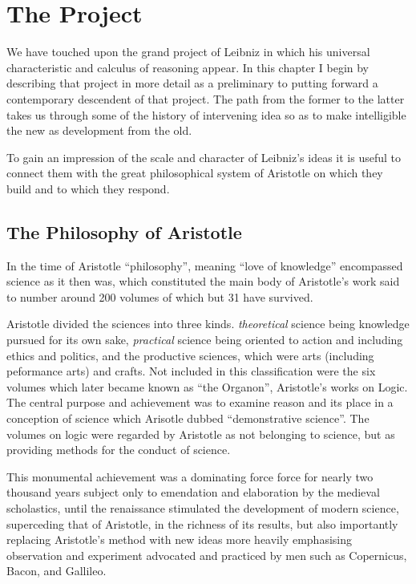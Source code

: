 
\chapter{The Project}\label{TheProject}

We have touched upon the grand project of Leibniz in which his universal characteristic
and calculus of reasoning appear.
In this chapter I begin by describing that project in more detail as a preliminary
to putting forward a contemporary descendent of that project.
The path from the former to the latter takes us through some of the history of
intervening idea so as to make intelligible the new as development from the old.

To gain an impression of the scale and character of Leibniz's ideas it is useful to connect them with
the great philosophical system of Aristotle on which they build and to which they respond.

\section{The Philosophy of Aristotle}

In the time of Aristotle ``philosophy'', meaning ``love of knowledge'' encompassed science as
it then was, which constituted the main body of Aristotle's work said to number around 200 volumes
of which but 31 have survived.

Aristotle divided the sciences into three kinds.
\emph{theoretical} science being knowledge pursued for 
its own sake, \emph{practical} science being oriented to action and including ethics and politics, and
the productive sciences, which were arts (including peformance arts) and crafts.
Not included in this classification were the six volumes which later became known as ``the Organon'', Aristotle's
works on Logic.
The central purpose and achievement was to examine reason and its place in a conception of science which Arisotle dubbed ``demonstrative science''.
The volumes on logic were regarded by Aristotle as not belonging to science, but as providing methods for the conduct of science.

This monumental achievement was a dominating force force for nearly two thousand years
subject only to emendation and elaboration by the medieval scholastics, until the renaissance
stimulated the development of modern science, superceding that of Aristotle, in the richness
of its results, but also importantly replacing Aristotle's method with new ideas more heavily
emphasising observation and experiment advocated and practiced by men such as Copernicus, Bacon,
and Gallileo.

